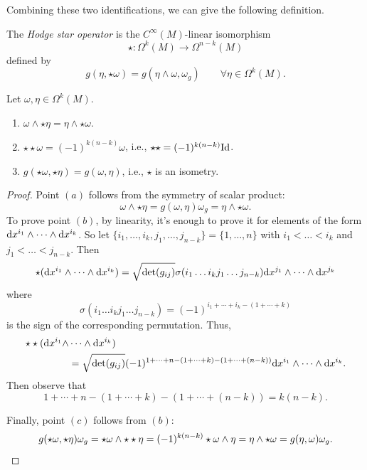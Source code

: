 Combining these two identifications, we can give the following definition. 
\begin{defn}
    The \emph{Hodge star operator} is the \(C^\infty(M)\)-linear isomorphism 
    \[
        \star \colon \Omega^k(M) \to \Omega^{n-k}(M)
    \]
    defined by
    \[
        g(\eta, \star\omega) = g(\eta \wedge \omega, \omega_g) \qquad \forall \eta \in \Omega^k(M).
    \]
\end{defn}

\begin{lemma}
    Let \(\omega, \eta \in \Omega^k(M)\).
    \begin{enumerate}[label=(\alph*)]
        \item \(\omega \wedge \star \eta = \eta \wedge \star \omega\).
        \item \(\star \star \omega = (-1)^{k(n-k)} \omega\), i.e., \(\star \star = (-1)^{k(n-k)}\mathrm{Id}\).
        \item \(g(\star \omega, \star \eta) = g(\omega,\eta)\), i.e., \(\star\) is an isometry. 
    \end{enumerate}
\end{lemma}
\begin{proof}
    Point \((a)\) follows from the symmetry of scalar product:
    \[
        \omega \wedge \star \eta = g(\omega,\eta)\omega_g = \eta \wedge \star \omega.
    \]
    To prove point \((b)\), by linearity, it's enough to prove it for elements of the form \(\mathrm{d} x^{i_1} \wedge \cdots \wedge \mathrm{d} x^{i_k}\). So let \(\{i_1,\dots,i_k,j_1,\dots,j_{n-k}\} = \{1,\dots,n\}\) with \(i_1 < \dots < i_k\) and \(j_1 < \dots < j_{n-k}\). Then
    \[
        \star (\mathrm{d} x^{i_1} \wedge \cdots \wedge \mathrm{d} x^{i_k}) = \sqrt{\det(g_{ij})}\sigma(i_1 \dots i_k j_1 \dots j_{n-k})\mathrm{d} x^{j_1} \wedge \cdots \wedge \mathrm{d} x^{j_k}
    \]
    where
    \[
    \sigma(i_1 \dots i_k j_1 \dots j_{n-k}) = (-1)^{i_1 + \cdots + i_k - (1+\cdots + k)}
    \]
    is the sign of the corresponding permutation.
    Thus,
    \[
    \begin{split}
        \star \star (\mathrm{d} x^{i_1} \wedge &\cdots \wedge \mathrm{d} x^{i_k}) \\
        &= \sqrt{\det(g_{ij})}{(-1)^{1+\cdots+n-(1+\cdots+k) - (1 +\cdots+(n-k))}}\mathrm{d} x^{i_1} \wedge \cdots \wedge \mathrm{d} x^{i_k}.
    \end{split}
    \]
    Then observe that
    \[        
    1+\cdots+n-(1+\cdots+k) - (1 +\cdots+(n-k)) = k(n-k).
    \]
    
    Finally, point \((c)\) follows from \((b)\):
    \[
    g(\star \omega, \star \eta) \omega_g = \star \omega \wedge \star \star \eta = (-1)^{k(n-k)} \star \omega \wedge \eta = \eta \wedge \star \omega = g(\eta,\omega)\omega_g. \qedhere
    \]
\end{proof}




